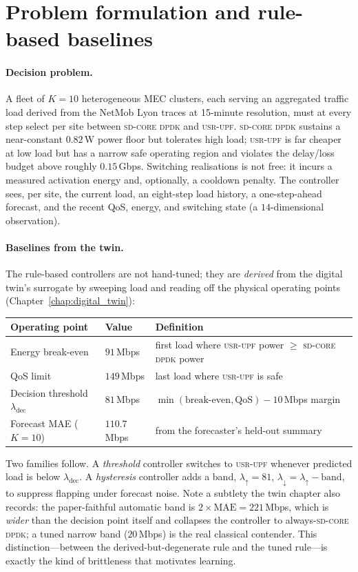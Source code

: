 \documentclass[12pt, a4paper]{report}
\newcommand{\dpdk}{\textsc{sd-core dpdk}}
\newcommand{\usr}{\textsc{usr-upf}}
\begin{document}
\section{Problem formulation and rule-based baselines}
\label{sec:ctrl_baselines}

\paragraph{Decision problem.} A fleet of $K=10$ heterogeneous MEC clusters, each
serving an aggregated traffic load derived from the NetMob Lyon traces at
15-minute resolution, must at every step select per site between \dpdk{} and
\usr{}. \dpdk{} sustains a near-constant $0.82$\,W power floor but tolerates high
load; \usr{} is far cheaper at low load but has a narrow safe operating region
and violates the delay/loss budget above roughly $0.15$\,Gbps. Switching
realisations is not free: it incurs a measured activation energy and, optionally,
a cooldown penalty. The controller sees, per site, the current load, an
eight-step load history, a one-step-ahead forecast, and the recent QoS, energy,
and switching state (a $14$-dimensional observation).

\paragraph{Baselines from the twin.} The rule-based controllers are not
hand-tuned; they are \emph{derived} from the digital twin's surrogate by
sweeping load and reading off the physical operating points
(Chapter~\ref{chap:digital_twin}):

\begin{center}
\begin{tabular}{lll}
\toprule
Operating point & Value & Definition \\
\midrule
Energy break-even & $91$\,Mbps & first load where \usr{} power $\ge$ \dpdk{} power \\
QoS limit & $149$\,Mbps & last load where \usr{} is safe \\
Decision threshold $\lambda_{\mathrm{dec}}$ & $81$\,Mbps & $\min(\text{break-even},\text{QoS}) - 10$\,Mbps margin \\
Forecast MAE ($K{=}10$) & $110.7$\,Mbps & from the forecaster's held-out summary \\
\bottomrule
\end{tabular}
\end{center}

Two families follow. A \emph{threshold} controller switches to \usr{} whenever
predicted load is below $\lambda_{\mathrm{dec}}$. A \emph{hysteresis} controller
adds a band, $\lambda_{\uparrow}=81$, $\lambda_{\downarrow}=\lambda_{\uparrow}-\text{band}$,
to suppress flapping under forecast noise. Note a subtlety the twin chapter also
records: the paper-faithful automatic band is $2\times\text{MAE}=221$\,Mbps,
which is \emph{wider} than the decision point itself and collapses the controller
to always-\dpdk{}; a tuned narrow band ($20$\,Mbps) is the real classical
contender. This distinction---between the derived-but-degenerate rule and the
tuned rule---is exactly the kind of brittleness that motivates learning.
\end{document}
